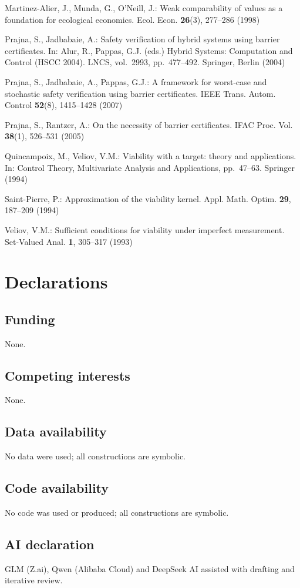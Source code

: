 \documentclass[11pt]{article}
\theoremstyle{definition}
\begin{document}
Martinez-Alier, J., Munda, G., O'Neill, J.: Weak comparability of values
as a foundation for ecological economics. Ecol. Econ. \textbf{26}(3),
277--286 (1998)

Prajna, S., Jadbabaie, A.: Safety verification of hybrid systems using
barrier certificates. In: Alur, R., Pappas, G.J. (eds.) Hybrid Systems:
Computation and Control (HSCC 2004). LNCS, vol.~2993, pp.~477--492.
Springer, Berlin (2004)

Prajna, S., Jadbabaie, A., Pappas, G.J.: A framework for worst-case and
stochastic safety verification using barrier certificates. IEEE Trans.
Autom. Control \textbf{52}(8), 1415--1428 (2007)

Prajna, S., Rantzer, A.: On the necessity of barrier certificates. IFAC
Proc. Vol. \textbf{38}(1), 526--531 (2005)

Quincampoix, M., Veliov, V.M.: Viability with a target: theory and
applications. In: Control Theory, Multivariate Analysis and
Applications, pp.~47--63. Springer (1994)

Saint-Pierre, P.: Approximation of the viability kernel. Appl. Math.
Optim. \textbf{29}, 187--209 (1994)

Veliov, V.M.: Sufficient conditions for viability under imperfect
measurement. Set-Valued Anal. \textbf{1}, 305--317 (1993)

\section*{Declarations}

\subsection*{Funding}

None.

\subsection*{Competing interests}

None.

\subsection*{Data availability}

No data were used; all constructions are symbolic.

\subsection*{Code availability}

No code was used or produced; all constructions are symbolic.

\subsection*{AI declaration}
GLM (Z.ai), Qwen (Alibaba Cloud) and DeepSeek AI assisted with drafting and iterative review.
\end{document}
